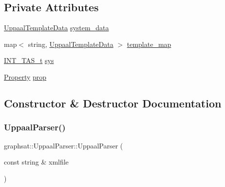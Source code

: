\subsection*{Private Attributes}
\begin{DoxyCompactItemize}
\item 
\mbox{\hyperlink{classgraphsat_1_1_uppaal_template_data}{Uppaal\+Template\+Data}} \mbox{\hyperlink{classgraphsat_1_1_uppaal_parser_a43fcbc15cd57d79d8852e6b3b7c0aacd}{system\+\_\+data}}
\item 
map$<$ string, \mbox{\hyperlink{classgraphsat_1_1_uppaal_template_data}{Uppaal\+Template\+Data}} $>$ \mbox{\hyperlink{classgraphsat_1_1_uppaal_parser_aa4059e649e542e41dcbd90a3d980db2d}{template\+\_\+map}}
\item 
\mbox{\hyperlink{namespacegraphsat_a72468138834e9a7182f32fed8035a2de}{I\+N\+T\+\_\+\+T\+A\+S\+\_\+t}} \mbox{\hyperlink{classgraphsat_1_1_uppaal_parser_a1a08527d766eab0bf83e019c3698264c}{sys}}
\item 
\mbox{\hyperlink{classgraphsat_1_1_property}{Property}} \mbox{\hyperlink{classgraphsat_1_1_uppaal_parser_abf98cbefe7cdf29168472c0cb57a4c40}{prop}}
\end{DoxyCompactItemize}


\subsection{Constructor \& Destructor Documentation}
\mbox{\label{classgraphsat_1_1_uppaal_parser_a39600d3f25a764a60f8e6abd36fc024a}} 
\subsubsection{\texorpdfstring{UppaalParser()}{UppaalParser()}}
{\footnotesize\ttfamily graphsat\+::\+Uppaal\+Parser\+::\+Uppaal\+Parser (\begin{DoxyParamCaption}\item[{const string \&}]{xmlfile }\end{DoxyParamCaption})}

